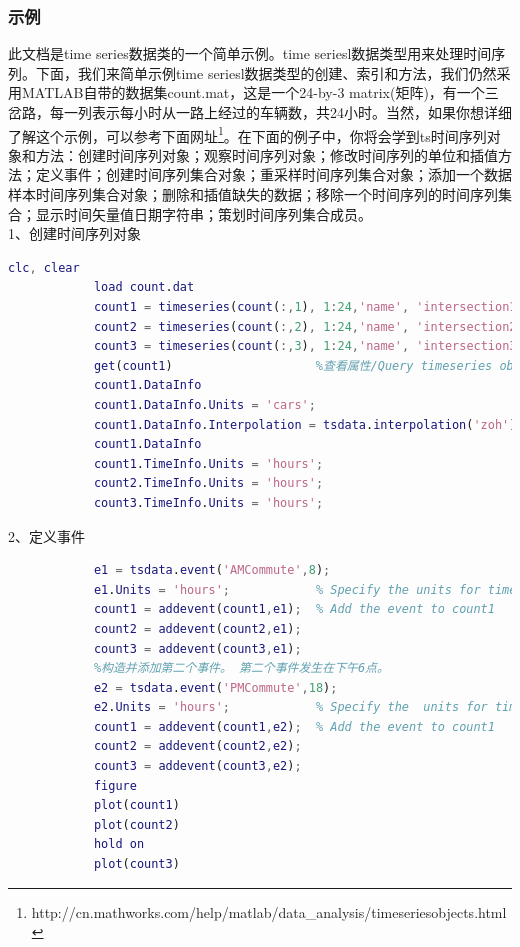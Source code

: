         \subsubsection{示例}
            \par
            此文档是time series数据类的一个简单示例。time seriesl数据类型用来处理时间序列。下面，我们来简单示例time seriesl数据类型的创建、索引和方法，我们仍然采用MATLAB自带的数据集count.mat，这是一个24-by-3 matrix(矩阵)，有一个三岔路，每一列表示每小时从一路上经过的车辆数，共24小时。当然，如果你想详细了解这个示例，可以参考下面网址\footnote{http://cn.mathworks.com/help/matlab/data\_analysis/time\-series\-objects.html}。在下面的例子中，你将会学到ts时间序列对象和方法：创建时间序列对象；观察时间序列对象；修改时间序列的单位和插值方法；定义事件；创建时间序列集合对象；重采样时间序列集合对象；添加一个数据样本时间序列集合对象；删除和插值缺失的数据；移除一个时间序列的时间序列集合；显示时间矢量值日期字符串；策划时间序列集合成员。\\
            1、创建时间序列对象
                \begin{lstlisting}[language=Matlab]
            clc, clear
            load count.dat
            count1 = timeseries(count(:,1), 1:24,'name', 'intersection1');%创建ts
            count2 = timeseries(count(:,2), 1:24,'name', 'intersection2');
            count3 = timeseries(count(:,3), 1:24,'name', 'intersection3');
            get(count1)                    %查看属性/Query timeseries object property values
            count1.DataInfo
            count1.DataInfo.Units = 'cars';
            count1.DataInfo.Interpolation = tsdata.interpolation('zoh');
            count1.DataInfo
            count1.TimeInfo.Units = 'hours';
            count2.TimeInfo.Units = 'hours';
            count3.TimeInfo.Units = 'hours';
                \end{lstlisting}
            2、定义事件
                \begin{lstlisting}[language=Matlab]
            %Add two events to the data that mark the times of the AM commute and PM commute.
            e1 = tsdata.event('AMCommute',8);
            e1.Units = 'hours';            % Specify the units for time
            count1 = addevent(count1,e1);  % Add the event to count1
            count2 = addevent(count2,e1);
            count3 = addevent(count3,e1);
            %构造并添加第二个事件。 第二个事件发生在下午6点。
            e2 = tsdata.event('PMCommute',18);
            e2.Units = 'hours';            % Specify the  units for time
            count1 = addevent(count1,e2);  % Add the event to count1
            count2 = addevent(count2,e2);
            count3 = addevent(count3,e2);
            figure
            plot(count1)
            plot(count2)
            hold on
            plot(count3)
                \end{lstlisting}

